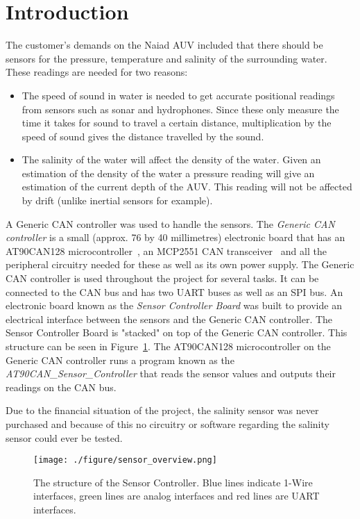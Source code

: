 
\section{Introduction}\label{sec:introduction}
The customer's demands on the Naiad AUV included that there should be sensors for the pressure, temperature and salinity of the surrounding water. These readings are needed for two reasons: 

\begin{itemize}
\item The speed of sound in water is needed to get accurate positional readings from sensors such as sonar and hydrophones. Since these only measure the time it takes for sound to travel a certain distance, multiplication by the speed of sound gives the distance travelled by the sound.

\item The salinity of the water will affect the density of the water. Given an estimation of the density of the water a pressure reading will give an estimation of the current depth of the AUV. This reading will not be affected by drift (unlike inertial sensors for example).

\end{itemize}

A Generic CAN controller was used to handle the sensors. The \emph{Generic CAN controller} is a small (approx. 76 by 40 millimetres) electronic board that has an AT90CAN128 microcontroller~\cite{web:at90can}, an MCP2551 CAN transceiver~\cite{web:mcp2551} and all the peripheral circuitry needed for these as well as its own power supply. The Generic CAN controller is used throughout the project for several tasks. It can be connected to the CAN bus and has two UART buses as well as an SPI bus. \newline
An electronic board known as the \emph{Sensor Controller Board} was built to provide an electrical interface between the sensors and the Generic CAN controller. The Sensor Controller Board is "stacked" on top of the Generic CAN controller. This structure can be seen in Figure~\ref{fig:sensor_overview}.  \newline
The AT90CAN128 microcontroller on the Generic CAN controller runs a program known as the \newline
\emph{AT90CAN\_Sensor\_Controller} that reads the sensor values and outputs their readings on the CAN bus.

Due to the financial situation of the project, the salinity sensor was never purchased and because of this no circuitry or software regarding  the salinity sensor could ever be tested. 

\begin{figure}[h]
    \texttt{[image: ./figure/sensor\_overview.png]}
    \caption{The structure of the Sensor Controller. Blue lines indicate 1-Wire interfaces, green lines are analog interfaces and red lines are UART interfaces.}
    \label{fig:sensor_overview}
\end{figure}